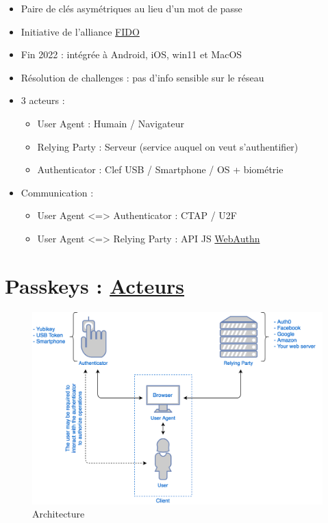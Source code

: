\begin{itemize}
\tightlist
\item
  Paire de clés asymétriques au lieu d'un mot de passe
\item
  Initiative de l'alliance
  \href{https://fidoalliance.org/members/}{FIDO}
\item
  Fin 2022 : intégrée à Android, iOS, win11 et MacOS
\item
  Résolution de challenges : pas d'info sensible sur le réseau
\item
  3 acteurs :

  \begin{itemize}
  \tightlist
  \item
    User Agent : Humain / Navigateur
  \item
    Relying Party : Serveur (service auquel on veut s'authentifier)
  \item
    Authenticator : Clef USB / Smartphone / OS + biométrie
  \end{itemize}
\item
  Communication :

  \begin{itemize}
  \tightlist
  \item
    User Agent \textless=\textgreater{} Authenticator : CTAP / U2F
  \item
    User Agent \textless=\textgreater{} Relying Party : API JS
    \href{https://webauthn.guide/}{WebAuthn}
  \end{itemize}
\end{itemize}

\hypertarget{passkeys-acteurs31}{%
\section{\texorpdfstring{Passkeys :
\href{https://auth0.com/blog/introduction-to-web-authentication/}{Acteurs}}{Passkeys : Acteurs}}\label{passkeys-acteurs31}}

\begin{figure}
\centering
\includegraphics{src/img/1-Web-Authentication-Entities.png}
\caption{Architecture}
\end{figure}

